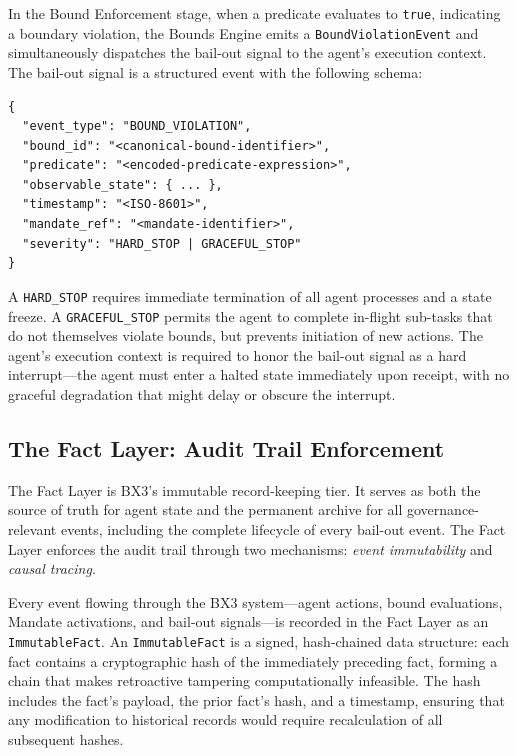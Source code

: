 In the Bound Enforcement stage, when a predicate evaluates to \texttt{true}, indicating a boundary violation, the Bounds Engine emits a \texttt{BoundViolationEvent} and simultaneously dispatches the bail-out signal to the agent's execution context. The bail-out signal is a structured event with the following schema:

\begin{verbatim}
{
  "event_type": "BOUND_VIOLATION",
  "bound_id": "<canonical-bound-identifier>",
  "predicate": "<encoded-predicate-expression>",
  "observable_state": { ... },
  "timestamp": "<ISO-8601>",
  "mandate_ref": "<mandate-identifier>",
  "severity": "HARD_STOP | GRACEFUL_STOP"
}
\end{verbatim}

A \texttt{HARD\_STOP} requires immediate termination of all agent processes and a state freeze. A \texttt{GRACEFUL\_STOP} permits the agent to complete in-flight sub-tasks that do not themselves violate bounds, but prevents initiation of new actions. The agent's execution context is required to honor the bail-out signal as a hard interrupt—the agent must enter a halted state immediately upon receipt, with no graceful degradation that might delay or obscure the interrupt.

\subsection{The Fact Layer: Audit Trail Enforcement}
\label{subsection:bailout-fact-layer}

The Fact Layer is BX3's immutable record-keeping tier. It serves as both the source of truth for agent state and the permanent archive for all governance-relevant events, including the complete lifecycle of every bail-out event. The Fact Layer enforces the audit trail through two mechanisms: \emph{event immutability} and \emph{causal tracing}.

Every event flowing through the BX3 system—agent actions, bound evaluations, Mandate activations, and bail-out signals—is recorded in the Fact Layer as an \texttt{ImmutableFact}. An \texttt{ImmutableFact} is a signed, hash-chained data structure: each fact contains a cryptographic hash of the immediately preceding fact, forming a chain that makes retroactive tampering computationally infeasible. The hash includes the fact's payload, the prior fact's hash, and a timestamp, ensuring that any modification to historical records would require recalculation of all subsequent hashes.

